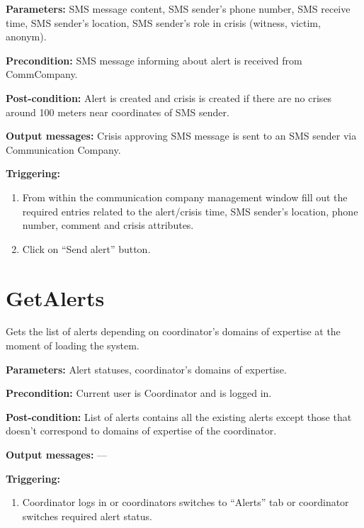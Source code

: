 \begin{description}

\item \textbf{Parameters:} SMS message content, SMS sender's phone number, SMS
receive time, SMS sender's location, SMS sender's role in crisis (witness,
victim, anonym).
\item \textbf{Precondition:} SMS message informing about alert is received from
CommCompany.
\item \textbf{Post-condition:} Alert is created and crisis is created if there
are no crises around 100 meters near coordinates of SMS sender.
\item \textbf{Output messages:} Crisis approving SMS message is sent to an SMS
sender via Communication Company.

\item \textbf{Triggering:}
\begin{enumerate}
\item From within the communication company management window fill out the
required entries related to the alert/crisis time, SMS sender's location, phone
number, comment and crisis attributes.
\item Click on ``Send alert'' button.
\end{enumerate}
 
\end{description}

\section{GetAlerts}
\label{operation:GetAlerts}
 Gets the list of alerts depending on coordinator's domains of expertise at the
 moment of loading the system.

\begin{description}

\item \textbf{Parameters:} Alert statuses, coordinator's domains of expertise.
\item \textbf{Precondition:} Current user is Coordinator and is
logged in.
\item \textbf{Post-condition:} List of alerts contains all the existing alerts
except those that doesn't correspond to domains of expertise of the coordinator.
\item \textbf{Output messages:} ---

\item \textbf{Triggering:}
\begin{enumerate}
\item Coordinator logs in or coordinators switches to ``Alerts'' tab or
coordinator switches required alert status.
\end{enumerate}
 
\end{description}

